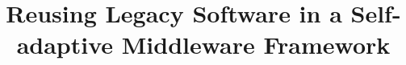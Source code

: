 \documentclass{acm_proc_article-sp}
\begin{document}
%

\title{Reusing Legacy Software in a Self-adaptive Middleware Framework}

%
%
%
%
%


\end{document}
